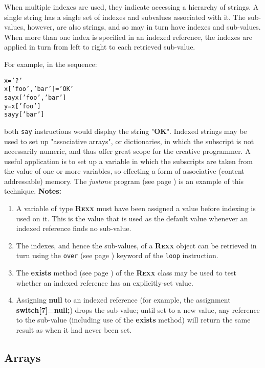 When multiple indexes are used, they indicate accessing a hierarchy of
strings.  A single \nr{} string has a single set of indexes and
subvalues associated with it.  The sub-values, however, are also \nr{}
strings, and so may in turn have indexes and sub-values.  When more than
one index is specified in an indexed reference, the indexes are applied
in turn from left to right to each retrieved sub-value.
 
For example, in the sequence:
\begin{alltt}
x='?'
x['foo', 'bar']='OK'
say x['foo', 'bar']
y=x['foo']
say y['bar']
\end{alltt}
both \texttt{say} instructions would display the string
"\textbf{OK}".
 Indexed strings may be used to set up "associative arrays", or
dictionaries, in which the subscript is not necessarily numeric, and
thus offer great scope for the creative programmer.
A useful application is to set up a variable in which the subscripts
are taken from the value of one or more variables, so effecting a form
of associative (content addressable) memory.
The  \emph{justone} program (see page \pageref{refjust1})  is an example of this
technique.
 \textbf{Notes:}
\begin{enumerate}
\item 
A variable of type \textbf{R\textsc{exx}} must have been assigned a value
before indexing is used on it.
This is the value that is used as the default value whenever an indexed
reference finds no sub-value.
\item 
The indexes, and hence the sub-values, of a \textbf{R\textsc{exx}} object can
be retrieved in turn using the  \texttt{over} (see page \pageref{refloopov})  keyword
of the \texttt{loop} instruction.
\item 
The  \textbf{exists} method (see page \pageref{refexists})  of the \textbf{R\textsc{exx}}
class may be used to test whether an indexed reference has an
explicitly-set value.
\item 
Assigning \textbf{null} to an indexed reference (for example, the
assignment \textbf{switch[7]=null;}) drops the sub-value;
until set to a new value, any reference to the sub-value (including use
of the \textbf{exists} method) will return the same result as
when it had never been set.
\end{enumerate}
\subsection{Arrays}\label{refarray}
 
